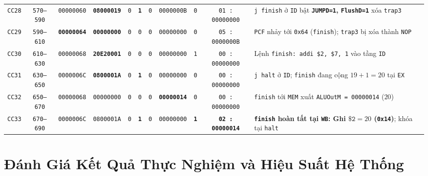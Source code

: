 \documentclass[12pt,a4paper]{report}
\begin{document}
\begin{table}[H]
{{\begin{tabular}{@{}ccccccccccl@{}}
\texttt{CC28} & \texttt{570--590} & \texttt{00000060} & \textbf{\texttt{08000019}} & \texttt{0} & \textbf{\texttt{1}} & \texttt{0} & \texttt{0000000B} & \texttt{0} & \texttt{01 : 00000000} & \parbox{11.5cm}{\raggedright \texttt{j finish} ở \texttt{ID} bật \textbf{\texttt{JUMPD=1}, \texttt{FlushD=1}} xóa \texttt{trap3}} \\
\texttt{CC29} & \texttt{590--610} & \textbf{\texttt{00000064}} & \textbf{\texttt{00000000}} & \texttt{0} & \texttt{0} & \texttt{0} & \texttt{00000000} & \texttt{0} & \texttt{05 : 0000000B} & \parbox{11.5cm}{\raggedright \texttt{PCF} nhảy tới \texttt{0x64} (\texttt{finish}); \texttt{trap3} bị xóa thành \texttt{NOP}} \\
\texttt{CC30} & \texttt{610--630} & \texttt{00000068} & \textbf{\texttt{20E20001}} & \texttt{0} & \texttt{0} & \texttt{0} & \texttt{00000000} & \texttt{1} & \texttt{00 : 00000000} & \parbox{11.5cm}{\raggedright Lệnh \texttt{finish: addi \$2, \$7, 1} vào tầng \texttt{ID}} \\
\texttt{CC31} & \texttt{630--650} & \texttt{0000006C} & \textbf{\texttt{0800001A}} & \texttt{0} & \textbf{\texttt{1}} & \texttt{0} & \texttt{00000000} & \texttt{0} & \texttt{00 : 00000000} & \parbox{11.5cm}{\raggedright \texttt{j halt} ở \texttt{ID}; \texttt{finish} đang cộng $19+1=20$ tại \texttt{EX}} \\
\texttt{CC32} & \texttt{650--670} & \texttt{00000068} & \texttt{00000000} & \texttt{0} & \texttt{0} & \texttt{0} & \textbf{\texttt{00000014}} & \texttt{0} & \texttt{00 : 00000000} & \parbox{11.5cm}{\raggedright \texttt{finish} tới \texttt{MEM} xuất \texttt{ALUOutM = 00000014} ($20$)} \\
\texttt{CC33} & \texttt{670--690} & \texttt{0000006C} & \texttt{0800001A} & \texttt{0} & \textbf{\texttt{1}} & \texttt{0} & \texttt{00000000} & \textbf{\texttt{1}} & \textbf{\texttt{02 : 00000014}} & \parbox{11.5cm}{\raggedright \textbf{\texttt{finish} hoàn tất tại \texttt{WB}: Ghi $\texttt{\$2} = 20$ (\texttt{0x14})}; khóa tại \texttt{halt}} \\ \bottomrule
\end{tabular}%
}%
}
\end{table}
\chapter{Đánh Giá Kết Quả Thực Nghiệm và Hiệu Suất Hệ Thống}
\end{document}
